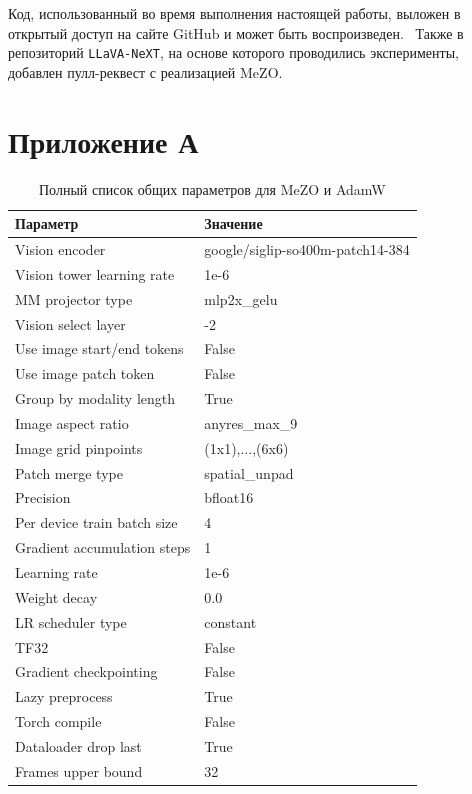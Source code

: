 \documentclass[LI,KR]{HSEUniversity}
\begin{document}
Код, использованный во время выполнения настоящей работы, выложен в открытый доступ
на сайте GitHub и может быть воспроизведен.~
Также в репозиторий \texttt{LLaVA-NeXT}, на основе которого проводились эксперименты, добавлен пулл-реквест с реализацией MeZO.~

\printbibliography

\chapter*{Приложение А}

\begin{table}[H]
\centering
\begin{tabular}{|l|l|}
\hline
\textbf{Параметр} & \textbf{Значение} \\ \hline
Vision encoder & google/siglip-so400m-patch14-384 \\ \hline
Vision tower learning rate & 1e-6 \\ \hline
MM projector type & mlp2x\_gelu \\ \hline
Vision select layer & -2 \\ \hline
Use image start/end tokens & False \\ \hline
Use image patch token & False \\ \hline
Group by modality length & True \\ \hline
Image aspect ratio & anyres\_max\_9 \\ \hline
Image grid pinpoints & (1x1),...,(6x6) \\ \hline
Patch merge type & spatial\_unpad \\ \hline
Precision & bfloat16 \\ \hline
Per device train batch size & 4 \\ \hline
Gradient accumulation steps & 1 \\ \hline
Learning rate & 1e-6 \\ \hline
Weight decay & 0.0 \\ \hline
LR scheduler type & constant \\ \hline
TF32 & False \\ \hline
Gradient checkpointing & False \\ \hline
Lazy preprocess & True \\ \hline
Torch compile & False \\ \hline
Dataloader drop last & True \\ \hline
Frames upper bound & 32 \\ \hline
\end{tabular}
\caption{Полный список общих параметров для MeZO и AdamW}
\label{app:mezo-parameters}
\end{table}
\end{document}
